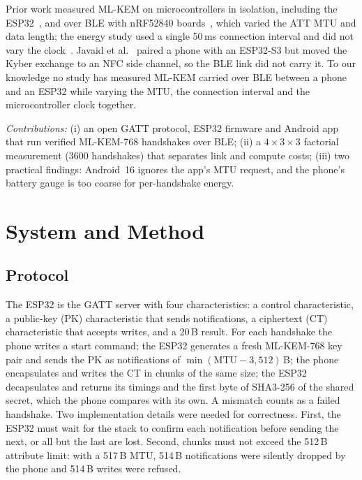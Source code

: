 \documentclass[journal]{IEEEtran}
\begin{document}
Prior work measured ML-KEM on microcontrollers in isolation, including the
ESP32~\cite{segatz2025kyberesp32,azevedo2025multicore,nagy2025mlkem}, and over
BLE with nRF52840 boards~\cite{liu2024quantumble,liu2026energy}, which
varied the ATT MTU and data length; the energy study used a single 50\,ms
connection interval and did not vary the clock~\cite{liu2026energy}. Javaid et al.~\cite{javaid2026nfc} paired a phone with an
ESP32-S3 but moved the Kyber exchange to an NFC side channel, so the BLE link
did not carry it. To our knowledge no study has measured ML-KEM carried over
BLE between a phone and an ESP32 while varying the MTU, the connection
interval and the microcontroller clock together.

\textit{Contributions:} (i) an open GATT protocol, ESP32 firmware and
Android app that run verified ML-KEM-768 handshakes over BLE; (ii) a
$4\times3\times3$ factorial measurement (3600 handshakes) that separates link
and compute costs; (iii) two practical findings: Android~16 ignores the app's
MTU request, and the phone's battery gauge is too coarse for per-handshake
energy.

\section{System and Method}
\subsection{Protocol}
The ESP32 is the GATT server with four characteristics: a control
characteristic, a public-key (PK) characteristic that sends notifications, a
ciphertext (CT) characteristic that accepts writes, and a 20\,B result. For
each handshake the phone writes a start command; the ESP32 generates a fresh
ML-KEM-768 key pair and sends the PK as notifications of
$\min(\text{MTU}-3, 512)$\,B; the phone encapsulates and writes the CT in
chunks of the same size; the ESP32 decapsulates and returns its timings and
the first byte of SHA3-256 of the shared secret, which the phone compares with
its own. A mismatch counts as a failed handshake. Two implementation details
were needed for correctness. First, the ESP32 must wait for the stack to
confirm each notification before sending the next, or all but the last are
lost. Second, chunks must not exceed the 512\,B attribute limit: with a 517\,B
MTU, 514\,B notifications were silently dropped by the phone and 514\,B writes
were refused.
\end{document}
